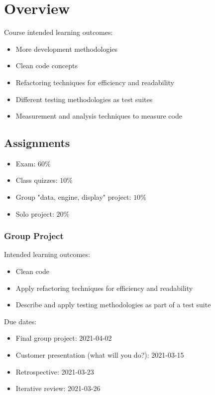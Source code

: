 \section{Overview}\label{sec:overview}

Course intended learning outcomes:
\begin{itemize}
	\item More development methodologies
	\item Clean code concepts
	\item Refactoring techniques for efficiency and readability
	\item Different testing methodologies as test suites
	\item Measurement and analysis techniques to measure code
\end{itemize}

\subsection{Assignments}\label{sub:assignments}

\begin{itemize}
	\item Exam: \(60\%\)
	\item Class quizzes: \(10\%\)
	\item Group "data, engine, display" project: \(10\%\)
	\item Solo project: \(20\%\)
\end{itemize}

\subsubsection{Group Project}\label{ssub:group_project}

Intended learning outcomes:
\begin{itemize}
	\item Clean code
	\item Apply refactoring techniques for efficiency and readability
	\item Describe and apply testing methodologies as part of a test suite
\end{itemize}
%
Due dates:
\begin{itemize}
	\item Final group project: 2021-04-02
	\item Customer presentation (what will you do?): 2021-03-15
	\item Retrospective: 2021-03-23
	\item Iterative review: 2021-03-26
\end{itemize}
